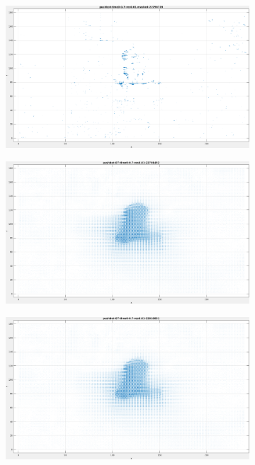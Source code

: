 \begin{figure}[tb]
\begin{subfigure}{.45\textwidth}
  \caption{}
\end{subfigure}
\begin{subfigure}{.45\textwidth}
  \centering
  \includegraphics[height=.6\linewidth]{figs/pushbot/pushbot-masked-2.png}
  \caption{}
\end{subfigure}
\begin{subfigure}{.45\textwidth}
  \centering
  \includegraphics[height=.6\linewidth]{figs/pushbot/pushbot-GT-1.png}
  \caption{}
\end{subfigure}
\begin{subfigure}{.45\textwidth}
  \centering
  \includegraphics[height=.6\linewidth]{figs/pushbot/pushbot-GT-2.png}

\end{subfigure}
\end{figure}
